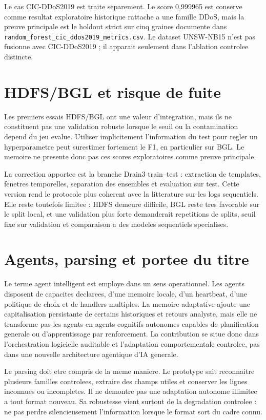 Le cas CIC-DDoS2019 est traite separement. Le score 0,999965 est conserve comme resultat exploratoire historique rattache a une famille DDoS, mais la preuve principale est le holdout strict sur cinq graines documente dans \texttt{random\_forest\_cic\_ddos2019\_metrics.csv}. Le dataset UNSW-NB15 n'est pas fusionne avec CIC-DDoS2019 ; il apparait seulement dans l'ablation controlee distincte.

\section{HDFS/BGL et risque de fuite}
Les premiers essais HDFS/BGL ont une valeur d'integration, mais ils ne constituent pas une validation robuste lorsque le seuil ou la contamination depend du jeu evalue. Utiliser implicitement l'information du test pour regler un hyperparametre peut surestimer fortement le F1, en particulier sur BGL. Le memoire ne presente donc pas ces scores exploratoires comme preuve principale.

La correction apportee est la branche Drain3 train--test : extraction de templates, fenetres temporelles, separation des ensembles et evaluation sur test. Cette version rend le protocole plus coherent avec la litterature sur les logs sequentiels. Elle reste toutefois limitee : HDFS demeure difficile, BGL reste tres favorable sur le split local, et une validation plus forte demanderait repetitions de splits, seuil fixe sur validation et comparaison a des modeles sequentiels specialises.

\section{Agents, parsing et portee du titre}
Le terme agent intelligent est employe dans un sens operationnel. Les agents disposent de capacites declarees, d'une memoire locale, d'un heartbeat, d'une politique de choix et de handlers multiples. La memoire adaptative ajoute une capitalisation persistante de certains historiques et retours analyste, mais elle ne transforme pas les agents en agents cognitifs autonomes capables de planification generale ou d'apprentissage par renforcement. La contribution se situe donc dans l'orchestration logicielle auditable et l'adaptation comportementale controlee, pas dans une nouvelle architecture agentique d'IA generale.

Le parsing doit etre compris de la meme maniere. Le prototype sait reconnaitre plusieurs familles controlees, extraire des champs utiles et conserver les lignes inconnues ou incompletes. Il ne demontre pas une adaptation autonome illimitee a tout format nouveau. Sa robustesse vient surtout de la degradation controlee : ne pas perdre silencieusement l'information lorsque le format sort du cadre connu.

